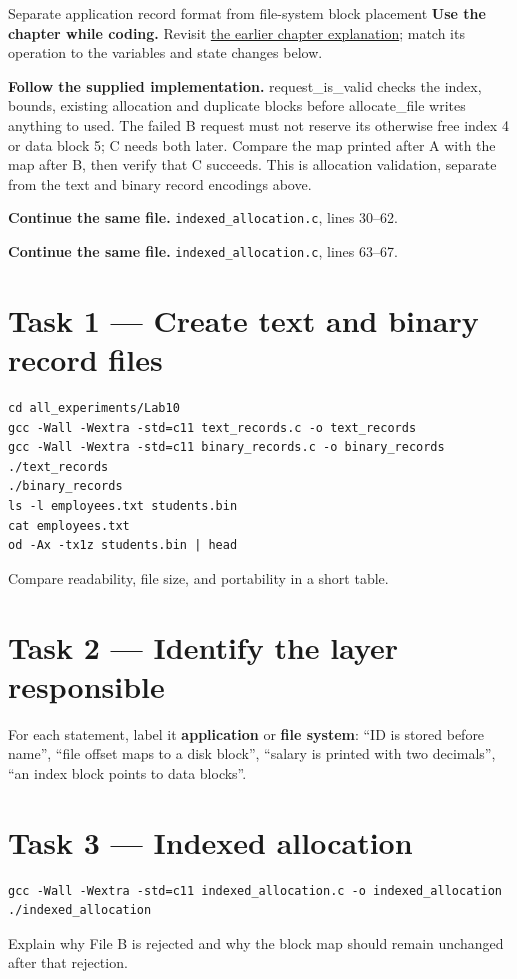 \begin{labproject}{Separate application record format from file-system block placement}
\textbf{Use the chapter while coding.} Revisit \hyperref[ch:filesystems]{the earlier chapter explanation}; match its operation to the variables and state changes below.

\textbf{Follow the supplied implementation.} request\_is\_valid checks the index, bounds, existing allocation and duplicate blocks before allocate\_file writes anything to used. The failed B request must not reserve its otherwise free index 4 or data block 5; C needs both later. Compare the map printed after A with the map after B, then verify that C succeeds. This is allocation validation, separate from the text and binary record encodings above.




\noindent\textbf{Continue the same file.} \texttt{indexed\_allocation.c}, lines 30--62.


\noindent\textbf{Continue the same file.} \texttt{indexed\_allocation.c}, lines 63--67.


\section*{Task 1 --- Create text and binary record files}
\begin{lstlisting}[style=utpbash]
cd all_experiments/Lab10
gcc -Wall -Wextra -std=c11 text_records.c -o text_records
gcc -Wall -Wextra -std=c11 binary_records.c -o binary_records
./text_records
./binary_records
ls -l employees.txt students.bin
cat employees.txt
od -Ax -tx1z students.bin | head
\end{lstlisting}
Compare readability, file size, and portability in a short table.

\section*{Task 2 --- Identify the layer responsible}
For each statement, label it \textbf{application} or \textbf{file system}: ``ID is stored before name'', ``file offset maps to a disk block'', ``salary is printed with two decimals'', ``an index block points to data blocks''.

\section*{Task 3 --- Indexed allocation}
\begin{lstlisting}[style=utpbash]
gcc -Wall -Wextra -std=c11 indexed_allocation.c -o indexed_allocation
./indexed_allocation
\end{lstlisting}
Explain why File B is rejected and why the block map should remain unchanged after that rejection.


\end{labproject}
